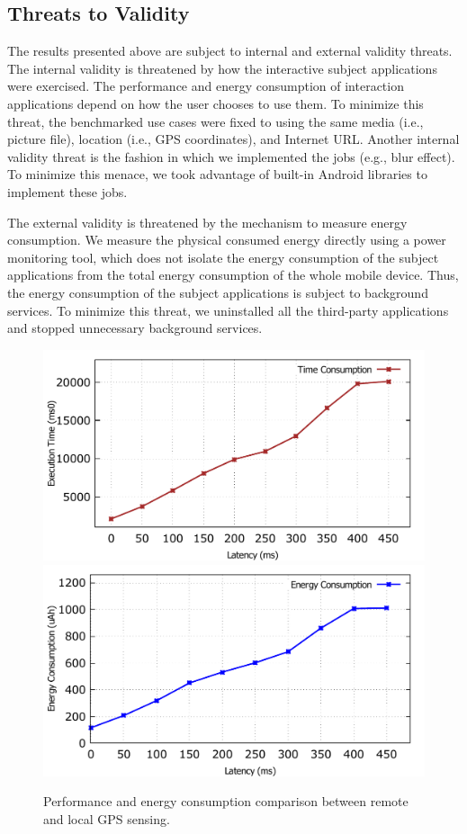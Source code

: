\documentclass{sig-alternate}
\begin{document}
\subsection{Threats to Validity}
The results presented above are subject to internal and external validity threats. The internal validity is threatened by how the interactive subject applications were exercised. The performance and energy consumption of interaction applications depend on how the user chooses to use them. To minimize this threat, the benchmarked use cases were fixed to using the same media (i.e., picture file), location (i.e., GPS coordinates), and Internet URL. Another internal validity threat is the fashion in which we implemented the jobs (e.g., blur effect). To minimize this menace, we took advantage of built-in Android libraries to implement these jobs.

The external validity is threatened by the mechanism to measure energy consumption. We measure the physical consumed energy directly using a power monitoring tool, which does not isolate the energy consumption of the subject applications from the total energy consumption of the whole mobile device. Thus, the energy consumption of the subject applications is subject to background services. To minimize this threat, we uninstalled all the third-party applications and stopped unnecessary background services.

\begin{figure}
	\centering
		\includegraphics[width=.42\textwidth]{data/off_multi_perf.pdf}
		\includegraphics[width=.42\textwidth]{data/off_multi_energy.pdf}
	\caption{Performance and energy consumption comparison between remote and local GPS sensing.}
	\label{fig:off_all}
\end{figure}
\end{document}
